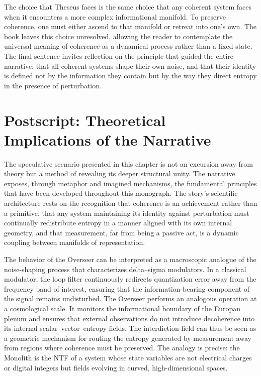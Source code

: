 The choice that Theseus faces is the same choice that any coherent system faces when it encounters a more complex informational manifold. To preserve coherence, one must either ascend to that manifold or retreat into one’s own. The book leaves this choice unresolved, allowing the reader to contemplate the universal meaning of coherence as a dynamical process rather than a fixed state. The final sentence invites reflection on the principle that guided the entire narrative: that all coherent systems shape their own noise, and that their identity is defined not by the information they contain but by the way they direct entropy in the presence of perturbation.

\section*{Postscript: Theoretical Implications of the Narrative}

The speculative scenario presented in this chapter is not an excursion away from theory but a method of revealing its deeper structural unity. The narrative exposes, through metaphor and imagined mechanisms, the fundamental principles that have been developed throughout this monograph. The story’s scientific architecture rests on the recognition that coherence is an achievement rather than a primitive, that any system maintaining its identity against perturbation must continually redistribute entropy in a manner aligned with its own internal geometry, and that measurement, far from being a passive act, is a dynamic coupling between manifolds of representation.

The behavior of the Overseer can be interpreted as a macroscopic analogue of the noise-shaping process that characterizes delta–sigma modulators. In a classical modulator, the loop filter continuously redirects quantization error away from the frequency band of interest, ensuring that the information-bearing component of the signal remains undisturbed. The Overseer performs an analogous operation at a cosmological scale. It monitors the informational boundary of the Europan plenum and ensures that external observations do not introduce decoherence into its internal scalar–vector–entropy fields. The interdiction field can thus be seen as a geometric mechanism for routing the entropy generated by measurement away from regions where coherence must be preserved. The analogy is precise: the Monolith is the NTF of a system whose state variables are not electrical charges or digital integers but fields evolving in curved, high-dimensional spaces.

